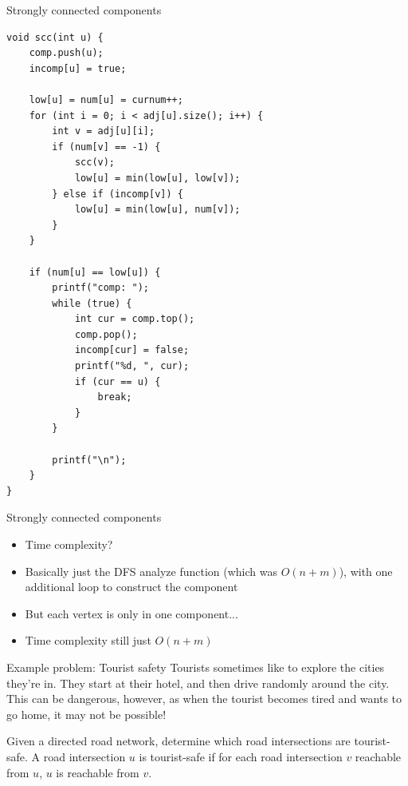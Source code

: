 \documentclass{beamer}
\begin{document}
\begin{frame}{Strongly connected components}
    \begin{verbatim}
void scc(int u) {
    comp.push(u);
    incomp[u] = true;

    low[u] = num[u] = curnum++;
    for (int i = 0; i < adj[u].size(); i++) {
        int v = adj[u][i];
        if (num[v] == -1) {
            scc(v);
            low[u] = min(low[u], low[v]);
        } else if (incomp[v]) {
            low[u] = min(low[u], num[v]);
        }
    }

    if (num[u] == low[u]) {
        printf("comp: ");
        while (true) {
            int cur = comp.top();
            comp.pop();
            incomp[cur] = false;
            printf("%d, ", cur);
            if (cur == u) {
                break;
            }
        }

        printf("\n");
    }
}
    \end{verbatim}
\end{frame}

\begin{frame}[plain]{Strongly connected components}
    \vspace{30pt}
    \begin{itemize}
        \item Time complexity?
        \item Basically just the DFS analyze function (which was $O(n + m)$), with one additional loop to construct the component
        \item But each vertex is only in one component...
        \item Time complexity still just $O(n + m)$
    \end{itemize}
\end{frame}

\begin{frame}[plain]{Example problem: Tourist safety}
    Tourists sometimes like to explore the cities they're in. They start at
    their hotel, and then drive randomly around the city. This can be
    dangerous, however, as when the tourist becomes tired and wants to go home,
    it may not be possible!

    Given a directed road network, determine which road intersections are
    tourist-safe. A road intersection $u$ is tourist-safe if for each road
    intersection $v$ reachable from $u$, $u$ is reachable from $v$.
\end{frame}
\end{document}
